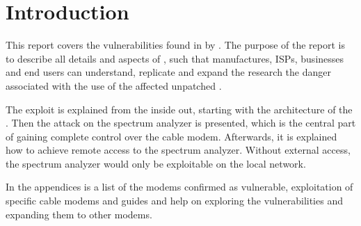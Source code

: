 \chapter{Introduction}

This report covers the \exploitname{} vulnerabilities found in \product{} by \Lyrebirds.
The purpose of the report is to describe all details and aspects of \exploitname{}, such that manufactures, ISPs, businesses and end users can understand, replicate and expand the research the danger associated with the use of the affected unpatched \product.

The exploit is explained from the inside out, starting with the architecture of the \product.
Then the attack on the spectrum analyzer is presented, which is the central part of gaining complete control over the cable modem.
Afterwards, it is explained how to achieve remote access to the spectrum analyzer. 
Without external access, the spectrum analyzer would only be exploitable on the local network.

In the appendices is a list of the modems confirmed as vulnerable, exploitation of specific cable modems and guides and help on exploring the vulnerabilities and expanding them to other modems.

